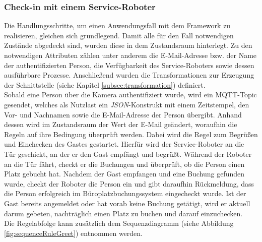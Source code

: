     \subsubsection*{Check-in mit einem Service-Roboter}
        Die Handlungsschritte, um einen Anwendungsfall mit dem Framework zu realisieren, gleichen sich grundlegend. 
        Damit alle für den Fall notwendigen Zustände abgedeckt sind, wurden diese in dem Zustandsraum hinterlegt. Zu den notwendigen Attributen 
        zählen unter anderem die E-Mail-Adresse bzw. der Name der authentifizierten Person, die Verfügbarkeit des Service-Roboters sowie dessen 
        ausführbare Prozesse. Anschließend wurden die Transformationen zur Erzeugung der Schnittstelle (siehe Kapitel \ref{subsec:transformation}) definiert. 
        \\
        \linebreak
        Sobald eine Person über die Kamera authentifiziert wurde, wird ein \acs{MQTT}-Topic gesendet, welches als Nutzlast ein \textit{JSON}-Konstrukt mit einem Zeitstempel, den 
        Vor- und Nachnamen sowie die E-Mail-Adresse der Person übergibt. Anhand dessen wird im Zustandsraum der Wert der E-Mail geändert, woraufhin die Regeln auf ihre 
        Bedingung überprüft werden. Dabei wird die Regel zum Begrüßen und Einchecken des Gastes gestartet. Hierfür wird der Service-Roboter an die Tür geschickt, an der er den 
        Gast empfängt und begrüßt. Während der Roboter an die Tür fährt, checkt er die Buchungen und überprüft, ob die Person einen Platz gebucht hat. 
        Nachdem der Gast empfangen und eine Buchung gefunden wurde, checkt der Roboter die Person ein und gibt daraufhin Rückmeldung, dass die Person erfolgreich im 
        Büroplatzbuchungssystem eingecheckt wurde. Ist der Gast bereits angemeldet oder hat vorab keine Buchung getätigt, wird er aktuell darum gebeten, nachträglich 
        einen Platz zu buchen und darauf einzuchecken. 
        \\
        Die Regelabfolge kann zusätzlich dem Sequenzdiagramm (siehe Abbildung \ref{fig:sequenceRuleGreet}) entnommen werden.
